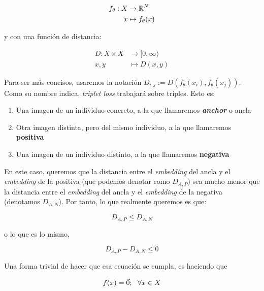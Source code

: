 \begin{equation}
\begin{split}
    f_{\theta}: X & \to \mathbb{R}^N \\
    x & \mapsto f_{\theta}(x)
\end{split}
\end{equation}

y con una función de distancia:

\begin{equation}
\begin{split}
    D: X \times X & \to [0, \infty) \\
    x, y & \mapsto D(x, y)
\end{split}
\end{equation}

Para ser más concisos, usaremos la notación $D_{i, j} := D(f_{\theta}(x_i), f_{\theta}(x_j))$. Como su nombre indica, \textit{triplet loss} trabajará sobre triples. Esto es:

\begin{enumerate}
    \item Una imagen de un individuo concreto, a la que llamaremos \textbf{\textit{anchor}} o ancla
    \item Otra imagen distinta, pero del mismo individuo, a la que llamaremos \textbf{positiva}
    \item Una imagen de un individuo distinto, a la que llamaremos \textbf{negativa}
\end{enumerate}

En este caso, queremos que la distancia entre el \textit{embedding} del ancla y el \textit{embedding} de la positiva (que podemos denotar como $D_{A, P}$) sea mucho menor que la distancia entre el \textit{embedding} del ancla y el \textit{embedding} de la negativa (denotamos $D_{A, N}$). Por tanto, lo que realmente queremos es que:

\begin{equation}
    D_{A, P} \leq D_{A, N}
\end{equation}

o lo que es lo mismo,

\begin{equation}
    D_{A, P} - D_{A, N} \leq 0
\end{equation}

Una forma trivial de hacer que esa ecuación se cumpla, es haciendo que

\begin{equation}
    f(x) = \vec{0}; \ \  \forall x \in X
\end{equation}

